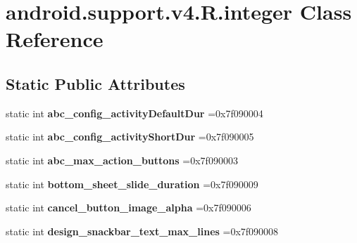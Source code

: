 \hypertarget{classandroid_1_1support_1_1v4_1_1R_1_1integer}{}\section{android.\+support.\+v4.\+R.\+integer Class Reference}
\label{classandroid_1_1support_1_1v4_1_1R_1_1integer}
\subsection*{Static Public Attributes}
\begin{DoxyCompactItemize}
\item 
\mbox{\label{classandroid_1_1support_1_1v4_1_1R_1_1integer_aae9cf5c0ab8ec82d02c31225dfae2da4}} 
static int {\bfseries abc\+\_\+config\+\_\+activity\+Default\+Dur} =0x7f090004
\item 
\mbox{\label{classandroid_1_1support_1_1v4_1_1R_1_1integer_a97aedc3810731e4140c82813b1041001}} 
static int {\bfseries abc\+\_\+config\+\_\+activity\+Short\+Dur} =0x7f090005
\item 
\mbox{\label{classandroid_1_1support_1_1v4_1_1R_1_1integer_a2efc5824bcc87d7438832ba59212f061}} 
static int {\bfseries abc\+\_\+max\+\_\+action\+\_\+buttons} =0x7f090003
\item 
\mbox{\label{classandroid_1_1support_1_1v4_1_1R_1_1integer_ae3b3a1f27a4208ad7a76a2dbdc5bbc71}} 
static int {\bfseries bottom\+\_\+sheet\+\_\+slide\+\_\+duration} =0x7f090009
\item 
\mbox{\label{classandroid_1_1support_1_1v4_1_1R_1_1integer_afa1d426cabf7e9b8e3b1457ef530768f}} 
static int {\bfseries cancel\+\_\+button\+\_\+image\+\_\+alpha} =0x7f090006
\item 
\mbox{\label{classandroid_1_1support_1_1v4_1_1R_1_1integer_a8af1c15a3ab667d6e5817981f301ca48}} 
static int {\bfseries design\+\_\+snackbar\+\_\+text\+\_\+max\+\_\+lines} =0x7f090008
\item 

\end{DoxyCompactItemize}
